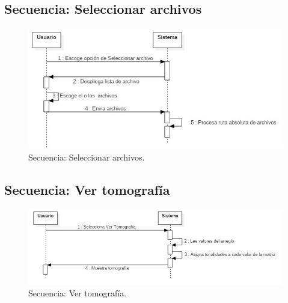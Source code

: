 \documentclass[12pt]{report}
\begin{document}
\subsection{Secuencia: Seleccionar archivos}
\begin{figure}[H]
\centering
\includegraphics[width = 12 cm, height = 7 cm]{seleccionar_archivo}
\caption{Secuencia: Seleccionar archivos.}
\end{figure}

\subsection{Secuencia: Ver tomografía}
\begin{figure}[H]
\centering
\includegraphics[width = 12 cm, height = 7 cm]{visualizar}
\caption{Secuencia: Ver tomografía.}
\end{figure}
\end{document}
